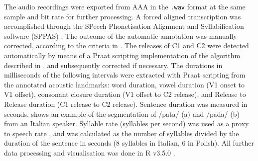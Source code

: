 \documentclass[preprint]{JASAnew}
\begin{document}

The audio recordings were exported from AAA in the \texttt{.wav} format
at the same sample and bit rate for further processing. A forced aligned
transcription was accomplished through the SPeech Phonetisation
Alignment and Syllabification software (SPPAS) \citep{bigi2015}. The
outcome of the automatic annotation was manually corrected, according to
the criteria in . The releases of C1 and C2 were
detected automatically by means of a Praat scripting implementation of
the algorithm described in \citet{ananthapadmanabha2014}, and
subsequently corrected if necessary. The durations in milliseconds of
the following intervals were extracted with Praat scripting from the
annotated acoustic landmarks: word duration, vowel duration (V1 onset to
V1 offset), consonant closure duration (V1 offset to C2 release), and
Release to Release duration (C1 release to C2 release). Sentence
duration was measured in seconds.  shows an example
of the segmentation of /pata/ (a) and /pada/ (b) from an Italian
speaker. Syllable rate (syllables per second) was used as a proxy to
speech rate \citep{plug2018}, and was calculated as the number of
syllables divided by the duration of the sentence in seconds (8
syllables in Italian, 6 in Polish). All further data processing and
visualisation was done in R v3.5.0 \citep{r-core-team2018, wickham2017}.
\end{document}
